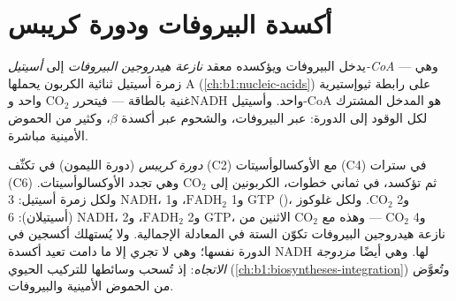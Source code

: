 \section{أكسدة البيروفات ودورة كريبس}

\begin{definition}\label{def:b1:respiration-fermentation:pdh}
يدخل البيروفات  ويؤكسده معقد \emph{نازعة هيدروجين البيروفات}
إلى \emph{أسيتيل-CoA} --- وهي زمرة أسيتيل ثنائية
الكربون يحملها  A (\cref{ch:b1:nucleic-acids}) على رابطة
ثيوإستيرية غنية بالطاقة --- فيتحرر $\mathrm{CO_2}$ واحد وNADH واحد.
وأسيتيل-CoA هو المدخل المشترك لكل الوقود إلى الدورة:  عبر
البيروفات، والشحوم عبر أكسدة $\beta$، وكثير من الحموض الأمينية
مباشرة.
\end{definition}

\begin{definition}\label{def:b1:respiration-fermentation:krebs}
\emph{دورة كريبس} (دورة  الليمون) في  تكثّف
 (C2) مع الأوكسالوأسيتات (C4) في سترات (C6) ثم تؤكسد، في
ثماني خطوات، الكربونين إلى $\mathrm{CO_2}$ وهي تجدد الأوكسالوأسيتات.
ولكل زمرة أسيتيل: 3 NADH، و1 $\mathrm{FADH_2}$، و1 GTP ()، و2 $\mathrm{CO_2}$. ولكل غلوكوز (أسيتيلان): 6 NADH،
و2 $\mathrm{FADH_2}$، و2 GTP، و4 $\mathrm{CO_2}$ --- وهذه مع
$\mathrm{CO_2}$ الاثنين من نازعة هيدروجين البيروفات تكوّن الستة في
المعادلة الإجمالية. ولا يُستهلك أكسجين في الدورة نفسها؛ وهي لا تجري
إلا ما دامت  تعيد أكسدة NADH لها. وهي أيضًا
\emph{مزدوجة الاتجاه}: إذ تُسحب وسائطها للتركيب الحيوي
(\cref{ch:b1:biosyntheses-integration}) وتُعوَّض من الحموض الأمينية
والبيروفات.
\end{definition}

